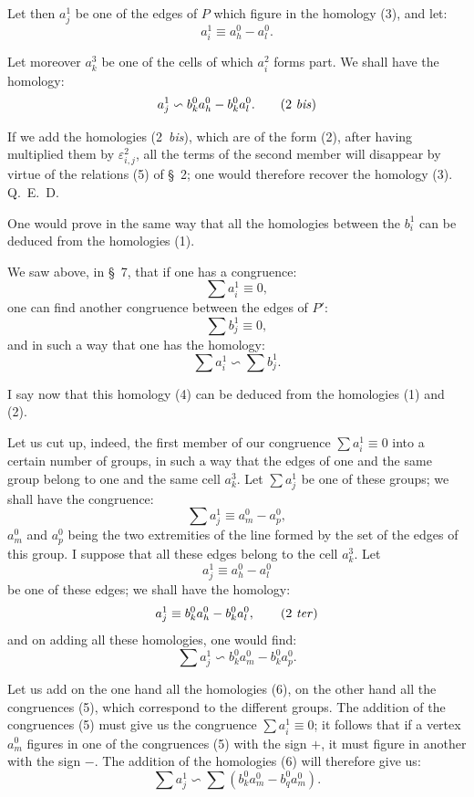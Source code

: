 \documentclass{article}
\begin{document}
Let then $a^{1}_{j}$ be one of the edges of $P$ which figure in the homology (3), and let:
\[ a^{1}_{i} \equiv a^{0}_{h} - a^{0}_{l}. \]

Let moreover $a^{3}_{k}$ be one of the cells of which $a^{2}_{i}$ forms part. We shall have the homology:
\[ a^{1}_{j} \backsim b^{0}_{k} a^{0}_{h} - b^{0}_{k} a^{0}_{l}. \tag{2 \textit{bis}} \]

If we add the homologies (2~\emph{bis}), which are of the form (2), after having multiplied them by $\varepsilon^{2}_{i,j}$, all the terms of the second member will disappear by virtue of the relations (5) of \S~2; one would therefore recover the homology (3). Q.~E.~D.

One would prove in the same way that all the homologies between the $b^{1}_{i}$ can be deduced from the homologies (1).

We saw above, in \S~7, that if one has a congruence:
\[ \sum a^{1}_{i} \equiv 0, \]
one can find another congruence between the edges of $P'$:
\[ \sum b^{1}_{j} \equiv 0, \]
and in such a way that one has the homology:
\[ \sum a^{1}_{i} \backsim \sum b^{1}_{j}. \tag{4} \]

I say now that this homology (4) can be deduced from the homologies (1) and (2).

Let us cut up, indeed, the first member of our congruence $\displaystyle\sum a^{1}_{i} \equiv 0$ into a certain number of groups, in such a way that the
edges of one and the same group belong to one and the same cell $a^{3}_{k}$. Let $\displaystyle\sum a^{1}_{j}$ be one of these groups; we shall have the congruence:
\[ \sum a^{1}_{j} \equiv a^{0}_{m} - a^{0}_{p}, \tag{5} \]
$a^{0}_{m}$ and $a^{0}_{p}$ being the two extremities of the line formed by the set of the edges of this group. I suppose that all these edges belong to the cell $a^{3}_{k}$. Let
\[ a^{1}_{j} \equiv a^{0}_{h} - a^{0}_{l} \]
be one of these edges; we shall have the homology:
\[ a^{1}_{j} \equiv b^{0}_{k} a^{0}_{h} - b^{0}_{k} a^{0}_{l}, \tag{2 \textit{ter}} \]
and on adding all these homologies, one would find:
\[ \sum a^{1}_{j} \backsim b^{0}_{k} a^{0}_{m} - b^{0}_{k} a^{0}_{p}. \tag{6} \]

Let us add on the one hand all the homologies (6), on the other hand all the congruences (5), which correspond to the different groups. The addition of the congruences (5) must give us the congruence $\displaystyle\sum a^{1}_{i} \equiv 0$; it follows that if a vertex $a^{0}_{m}$ figures in one of the congruences (5) with the sign $+$, it must figure in another with the sign $-$. The addition of the homologies (6) will therefore give us:
\[ \sum a^{1}_{j} \backsim \sum (b^{0}_{k} a^{0}_{m} - b^{0}_{q} a^{0}_{m}). \tag{7} \]
\end{document}
